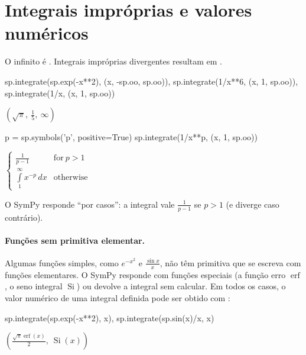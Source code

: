 \section{Integrais impróprias e valores numéricos}

O infinito é . Integrais impróprias divergentes resultam em .

\begin{entrada}
sp.integrate(sp.exp(-x**2), (x, -sp.oo, sp.oo)), sp.integrate(1/x**6, (x, 1, sp.oo)), sp.integrate(1/x, (x, 1, sp.oo))
\end{entrada}
\begin{saidamat}
$\displaystyle \left( \sqrt{\pi}, \  \frac{1}{5}, \  \infty\right)$
\end{saidamat}

\begin{entrada}
p = sp.symbols('p', positive=True)
sp.integrate(1/x**p, (x, 1, sp.oo))
\end{entrada}
\begin{saidamat}
$\displaystyle \begin{cases} \frac{1}{p - 1} & \text{for}\: p > 1 \\\int\limits_{1}^{\infty} x^{- p}\, dx & \text{otherwise} \end{cases}$
\end{saidamat}

O SymPy responde ``por casos'': a integral vale $\frac{1}{p-1}$ se $p>1$ (e diverge caso contrário).

\paragraph{Funções sem primitiva elementar.} Algumas funções simples, como $e^{-x^2}$ e $\frac{\sin x}{x}$, não têm
primitiva que se escreva com funções elementares. O SymPy responde com funções especiais (a função erro
$\operatorname{erf}$, o seno integral $\operatorname{Si}$) ou devolve a integral sem calcular. Em todos os casos, o
valor numérico de uma integral definida pode ser obtido com :

\begin{entrada}
sp.integrate(sp.exp(-x**2), x), sp.integrate(sp.sin(x)/x, x)
\end{entrada}
\begin{saidamat}
$\displaystyle \left( \frac{\sqrt{\pi} \operatorname{erf}{\left(x \right)}}{2}, \  \operatorname{Si}{\left(x \right)}\right)$
\end{saidamat}

